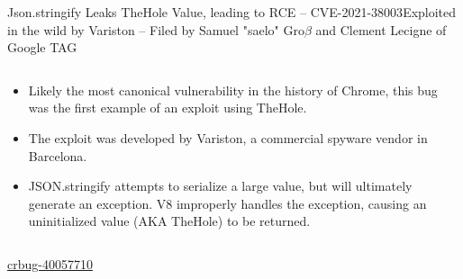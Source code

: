 \begin{frame}{Json.stringify Leaks TheHole Value, leading to RCE -- CVE-2021-38003}{Exploited in the wild by Variston -- Filed by Samuel "saelo" Gro$\beta$ and Clement Lecigne of Google TAG}
    \begin{columns}
        \begin{column}{0.5\textwidth}
            \begin{itemize}
                \item Likely the most canonical vulnerability in the history of Chrome, this bug was the first example of an exploit using TheHole. 
                \item The exploit was developed by Variston, a commercial spyware vendor in Barcelona. 
                \item JSON.stringify attempts to serialize a large value, but will ultimately generate an exception. V8 improperly handles the exception, causing an uninitialized value (AKA TheHole) to be returned.
            \end{itemize}
        \end{column}
        \begin{column}{0.5\textwidth}
            \inputminted{js}{code/json-stringify.tex}
        \end{column}
    \end{columns}
    \href{https://issues.chromium.org/issues/40057710}{\color{pink}crbug-40057710}
\end{frame}

